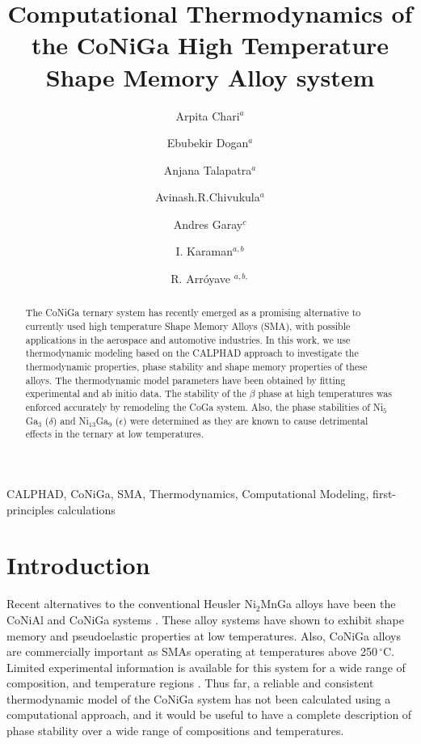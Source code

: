 \documentclass[article]{elsarticle}
\begin{document}
\begin{frontmatter}
\title{Computational Thermodynamics of the CoNiGa High Temperature Shape Memory Alloy system}
\author{Arpita Chari$^{a}$}
\author{Ebubekir Dogan$^{a}$}
\author{Anjana Talapatra$^{a}$}
\author{Avinash.R.Chivukula$^{a}$}
\author{Andres Garay$^{c}$}
\author{I. Karaman$^{a,b}$}
\author{R. Arr\'{o}yave $^{a,b,}$}
\address{$^a$ Department of Mechanical Engineering, Texas A\&M University, USA, 77843}%
\address{$^b$ Department of Materials Science and Engineering, Texas A\&M University, USA, 77843}%
\address{$^c$ Centro de Investigaci\'{o}n de Materiales Avanzados (CIMAV),Monterrey, Nuevo L\'{e}on, M\'{e}xico,}%
\begin{abstract}
The CoNiGa ternary system has recently emerged as a promising alternative to currently used high temperature Shape Memory Alloys (SMA), with possible applications in the aerospace and automotive industries. In this work, we use thermodynamic modeling based on the CALPHAD approach to investigate the thermodynamic properties, phase stability and shape memory properties of these alloys. The thermodynamic model parameters have been obtained by fitting experimental and ab initio data. The stability of the $\beta$ phase at high temperatures was enforced accurately by remodeling the CoGa system. Also, the phase stabilities of Ni$_{5}$Ga$_{3}$ ($\delta$) and Ni$_{13}$Ga$_{9}$ ($\epsilon$) were determined as they are known to cause detrimental effects in the ternary at low temperatures.
\end{abstract}
\begin{keyword}
CALPHAD, CoNiGa, SMA, Thermodynamics, Computational Modeling, first-principles calculations
\end{keyword}
\end{frontmatter}
\section{Introduction}

Recent alternatives to the conventional Heusler Ni$_{2}$MnGa alloys have been the CoNiAl and CoNiGa
systems \cite{Oik01}. These alloy systems have shown to exhibit shape memory and pseudoelastic properties at
low temperatures. Also, CoNiGa alloys are commercially important
as SMAs operating at temperatures above 250$\,^{\circ}\mathrm{C}$.
Limited experimental information is available for this system for a wide range of composition,
and temperature regions \cite{Oik06,Oik01,Liu06}. Thus far, a reliable and consistent thermodynamic
model of the CoNiGa system has not been calculated using a computational approach,
and it would be useful to have a complete description of phase stability over a wide range
of compositions and temperatures.
\end{document}
